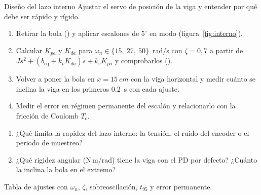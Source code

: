 \label{pr:interno}
\begin{practica}{Diseño del lazo interno}
\objetivos Ajustar el servo de posición de la viga y entender por qué debe ser rápido y rígido.
\procedimiento
\begin{enumerate}
  \item Retirar la bola () y aplicar escalones de $5^\circ$ en modo  (figura~\ref{fig:interno}).
  \item Calcular $K_{pa}$ y $K_{da}$ para $\omega_n\in\{15,\ 27,\ 50\}$~rad/s con $\zeta=0{,}7$ a partir de $Js^2+(b_{\text{eq}}+k_vK_{da})s+k_vK_{pa}$ y comprobarlos ().
  \item Volver a poner la bola en $x=\SI{15}{cm}$ con la viga horizontal y medir cuánto se inclina la viga en los primeros \SI{0.2}{s} con cada ajuste.
  \item Medir el error en régimen permanente del escalón y relacionarlo con la fricción de Coulomb $T_c$.
\end{enumerate}
\preguntas
\begin{enumerate}
  \item ¿Qué limita la rapidez del lazo interno: la tensión, el ruido del encoder o el periodo de muestreo?
  \item ¿Qué rigidez angular (N\,m/rad) tiene la viga con el PD por defecto? ¿Cuánto la inclina la bola en el extremo?
\end{enumerate}
\entregables Tabla de ajustes con $\omega_n$, $\zeta$, sobreoscilación, $t_{95}$ y error permanente.
\end{practica}

